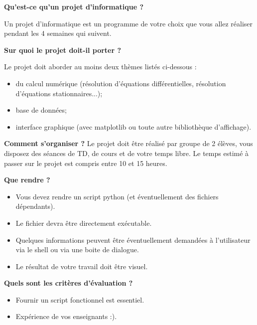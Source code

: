\documentclass[10pt,fleqn]{article} %
\begin{document}

\vspace{2cm}
\pagestyle{fancy}
\thispagestyle{plain}


\textbf{Qu'est-ce qu'un projet d'informatique ?}

Un projet d'informatique est un programme de votre choix que vous allez réaliser pendant les 4 semaines qui suivent.

\textbf{Sur quoi le projet doit-il porter ?}

Le projet doit aborder au moins deux thèmes listés ci-dessous : 
\begin{itemize}
\item du calcul numérique (résolution d'équations différentielles, résolution d'équations stationnaires...);
\item base de données;
\item interface graphique (avec matplotlib ou toute autre bibliothèque d'affichage).
\end{itemize}

\textbf{Comment s'organiser ?}
Le projet doit être réalisé par groupe de 2 élèves, vous disposez des séances de TD, de cours et de votre temps libre. Le temps estimé à passer sur le projet est compris entre 10 et 15 heures.

\textbf{Que rendre ?}
\begin{itemize}
\item Vous devez rendre un script python (et éventuellement des fichiers dépendants).
\item Le fichier devra être directement exécutable. 
\item Quelques informations peuvent être éventuellement demandées à l'utilisateur via le shell ou via une boite de dialogue.
\item Le résultat de votre travail doit être visuel.
\end{itemize}


\textbf{Quels sont les critères d'évaluation ?}

\begin{itemize}
\item Fournir un script fonctionnel est essentiel.
\item Expérience de vos enseignants :).
\end{itemize}
\end{document}

